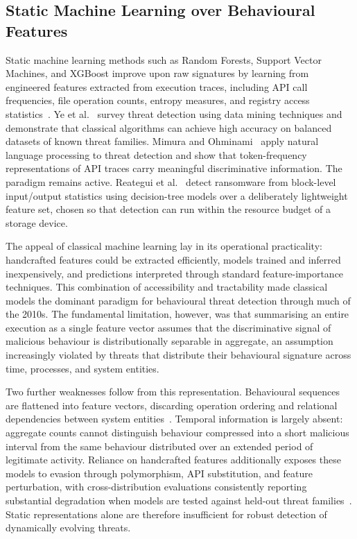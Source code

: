 \documentclass[%
    BCOR=10mm,
    DIV=13,
    toc=bibliography,
    toc=listof,
    oneside,
    12pt,
]{scrbook}
\begin{document}
\subsection{Static Machine Learning over Behavioural Features}
\label{subsec:static_ml}
Static machine learning methods such as Random Forests, Support Vector
Machines, and XGBoost improve upon raw signatures by learning from engineered
features extracted from execution traces, including API call frequencies, file
operation counts, entropy measures, and registry access
statistics~\cite{ucci2019survey, ye2017survey}. Ye et al.~\cite{ye2017survey}
survey threat detection using data mining techniques and demonstrate that
classical algorithms can achieve high accuracy on balanced datasets of known
threat families. Mimura and Ohminami~\cite{mimura2022nlp} apply natural
language processing to threat detection and show that token-frequency
representations of API traces carry meaningful discriminative information. The
paradigm remains active. Reategui et al.~\cite{reategui2024} detect ransomware
from block-level input/output statistics using decision-tree models over a
deliberately lightweight feature set, chosen so that detection can run within
the resource budget of a storage device.

The appeal of classical machine learning lay in its operational practicality:
handcrafted features could be extracted efficiently, models trained and
inferred inexpensively, and predictions interpreted through standard
feature-importance techniques. This combination of accessibility and
tractability made classical models the dominant paradigm for behavioural threat
detection through much of the 2010s. The fundamental limitation, however, was
that summarising an entire execution as a single feature vector assumes that
the discriminative signal of malicious behaviour is distributionally separable
in aggregate, an assumption increasingly violated by threats that distribute
their behavioural signature across time, processes, and system entities.

Two further weaknesses follow from this representation. Behavioural sequences
are flattened into feature vectors, discarding operation ordering and
relational dependencies between system entities~\cite{ucci2019survey,
bilot2024survey}. Temporal information is largely absent: aggregate counts
cannot distinguish behaviour compressed into a short malicious interval from
the same behaviour distributed over an extended period of legitimate activity.
Reliance on handcrafted features additionally exposes these models to evasion
through polymorphism, API substitution, and feature perturbation, with
cross-distribution evaluations consistently reporting substantial degradation
when models are tested against held-out threat families~\cite{guo2023zeroday}.
Static representations alone are therefore insufficient for robust detection of
dynamically evolving threats.
\end{document}
